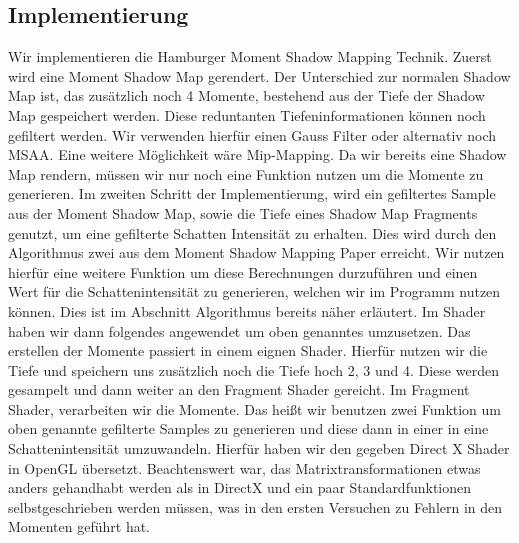 \documentclass[runningheaders,a4paper]{llncs}
\begin{document}
\subsection{Implementierung}

Wir implementieren die Hamburger Moment Shadow Mapping Technik. 
Zuerst wird eine Moment Shadow Map gerendert. Der Unterschied zur normalen Shadow Map ist, das zusätzlich noch 4 Momente, bestehend aus der Tiefe der Shadow Map gespeichert werden. Diese reduntanten Tiefeninformationen können noch gefiltert werden. Wir verwenden hierfür einen Gauss Filter oder alternativ noch MSAA. Eine weitere Möglichkeit wäre Mip-Mapping. Da wir bereits eine Shadow Map rendern, müssen wir nur noch eine Funktion nutzen um die Momente zu generieren.
Im zweiten Schritt der Implementierung, wird ein gefiltertes Sample aus der Moment Shadow Map, sowie die Tiefe eines Shadow Map Fragments genutzt, um eine gefilterte Schatten Intensität zu erhalten. Dies wird durch den Algorithmus zwei aus dem Moment Shadow Mapping Paper erreicht.\cite{msm}
Wir nutzen hierfür eine weitere Funktion um diese Berechnungen durzuführen und einen Wert für die Schattenintensität zu generieren, welchen wir im Programm nutzen können. Dies ist im Abschnitt Algorithmus bereits näher erläutert.
Im Shader haben wir dann folgendes angewendet um oben genanntes umzusetzen.
Das erstellen der Momente passiert in einem eignen Shader. Hierfür nutzen wir die Tiefe und speichern uns zusätzlich noch die Tiefe hoch 2, 3 und 4. Diese werden gesampelt und dann weiter an den Fragment Shader gereicht.
Im Fragment Shader, verarbeiten wir die Momente. Das heißt wir benutzen zwei Funktion um oben genannte gefilterte Samples zu generieren und diese dann in einer in eine Schattenintensität umzuwandeln. Hierfür haben wir den gegeben Direct X Shader in OpenGL übersetzt. Beachtenswert war, das Matrixtransformationen etwas anders gehandhabt werden als in DirectX und ein paar Standardfunktionen selbstgeschrieben werden müssen, was in den ersten Versuchen zu Fehlern in den Momenten geführt hat.
\end{document}
